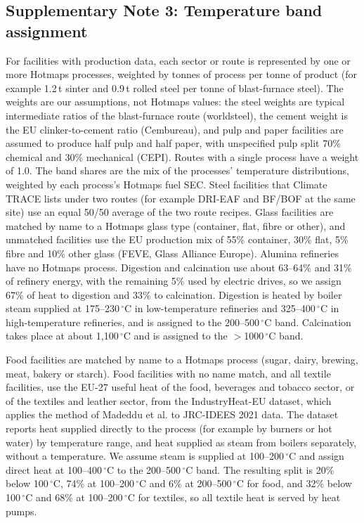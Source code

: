 \documentclass[11pt]{article}
\begin{document}
\subsection*{Supplementary Note 3: Temperature band assignment}
For facilities with production data, each sector or route is represented by one or more Hotmaps processes\cite{hotmaps2018}, weighted by tonnes of process per tonne of product (for example 1.2\,t sinter and 0.9\,t rolled steel per tonne of blast-furnace steel). The weights are our assumptions, not Hotmaps values: the steel weights are typical intermediate ratios of the blast-furnace route (worldsteel), the cement weight is the EU clinker-to-cement ratio (Cembureau), and pulp and paper facilities are assumed to produce half pulp and half paper, with unspecified pulp split 70\% chemical and 30\% mechanical (CEPI). Routes with a single process have a weight of 1.0. The band shares are the mix of the processes' temperature distributions, weighted by each process's Hotmaps fuel SEC. Steel facilities that Climate TRACE lists under two routes (for example DRI-EAF and BF/BOF at the same site) use an equal 50/50 average of the two route recipes. Glass facilities are matched by name to a Hotmaps glass type (container, flat, fibre or other), and unmatched facilities use the EU production mix of 55\% container, 30\% flat, 5\% fibre and 10\% other glass (FEVE, Glass Alliance Europe). Alumina refineries have no Hotmaps process. Digestion and calcination use about 63--64\% and 31\% of refinery energy, with the remaining 5\% used by electric drives\cite{aac2023alumina,deloitte2022alumina}, so we assign 67\% of heat to digestion and 33\% to calcination. Digestion is heated by boiler steam supplied at 175--230\,$^\circ$C in low-temperature refineries and 325--400\,$^\circ$C in high-temperature refineries\cite{deloitte2022alumina}, and is assigned to the 200--500\,$^\circ$C band. Calcination takes place at about 1,100\,$^\circ$C\cite{barnes2024bayer} and is assigned to the $>$1000\,$^\circ$C band.

Food facilities are matched by name to a Hotmaps process (sugar, dairy, brewing, meat, bakery or starch). Food facilities with no name match, and all textile facilities, use the EU-27 useful heat of the food, beverages and tobacco sector, or of the textiles and leather sector, from the IndustryHeat-EU dataset\cite{industryheateu2025}, which applies the method of Madeddu et al.\cite{madeddu2020} to JRC-IDEES 2021 data. The dataset reports heat supplied directly to the process (for example by burners or hot water) by temperature range, and heat supplied as steam from boilers separately, without a temperature. We assume steam is supplied at 100--200\,$^\circ$C and assign direct heat at 100--400\,$^\circ$C to the 200--500\,$^\circ$C band. The resulting split is 20\% below 100\,$^\circ$C, 74\% at 100--200\,$^\circ$C and 6\% at 200--500\,$^\circ$C for food, and 32\% below 100\,$^\circ$C and 68\% at 100--200\,$^\circ$C for textiles, so all textile heat is served by heat pumps.
\end{document}
